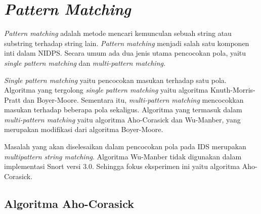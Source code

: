 



\section{\emph{Pattern Matching}}

  \emph{Pattern matching} adalah metode mencari kemunculan sebuah string atau substring terhadap string lain. \emph{Pattern matching} menjadi salah satu komponen inti dalam NIDPS. Secara umum ada dua jenis utama pencocokan pola, yaitu \emph{single pattern matching} dan \emph{multi-pattern matching}. 
  
  \emph{Single pattern matching} yaitu pencocokan masukan terhadap satu pola. Algoritma yang tergolong \emph{single pattern matching} yaitu algoritma Knuth-Morris-Pratt dan Boyer-Moore. Sementara itu, \emph{multi-pattern matching} mencocokkan masukan terhadap beberapa pola sekaligus. Algoritma yang termasuk dalam \emph{multi-pattern matching} yaitu algoritma Aho-Corasick dan Wu-Manber, yang merupakan modifikasi dari algoritma Boyer-Moore. 
  
  Masalah yang akan diselesaikan dalam pencocokan pola pada IDS merupakan \emph{multipattern string matching}. Algoritma Wu-Manber tidak digunakan dalam implementasi Snort versi 3.0. Sehingga fokus eksperimen ini yaitu algoritma Aho-Corasick.


  \subsection{Algoritma Aho-Corasick}

